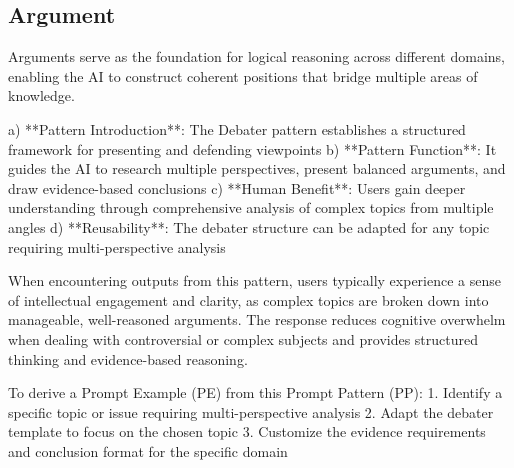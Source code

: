 

\subsection{Argument}
\label{subsec:Argument}
Arguments serve as the foundation for logical reasoning across different domains, enabling the AI to construct coherent positions that bridge multiple areas of knowledge.


a) **Pattern Introduction**: The Debater pattern establishes a structured framework for presenting and defending viewpoints
b) **Pattern Function**: It guides the AI to research multiple perspectives, present balanced arguments, and draw evidence-based conclusions  
c) **Human Benefit**: Users gain deeper understanding through comprehensive analysis of complex topics from multiple angles
d) **Reusability**: The debater structure can be adapted for any topic requiring multi-perspective analysis



When encountering outputs from this pattern, users typically experience a sense of intellectual engagement and clarity, as complex topics are broken down into manageable, well-reasoned arguments. 
The response reduces cognitive overwhelm when dealing with controversial or complex subjects and provides structured thinking and evidence-based reasoning.



To derive a Prompt Example (PE) from this Prompt Pattern (PP):
1. Identify a specific topic or issue requiring multi-perspective analysis
2. Adapt the debater template to focus on the chosen topic
3. Customize the evidence requirements and conclusion format for the specific domain



